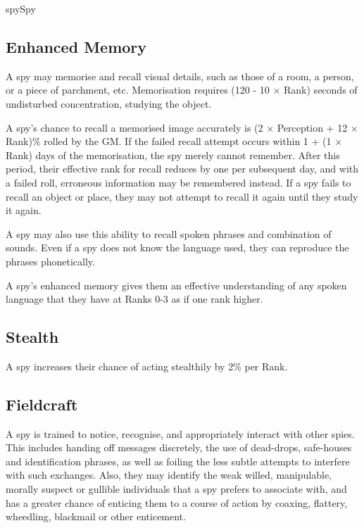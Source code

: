 \begin{Skill}[2.0]{spy}{Spy}
\subsection{Enhanced Memory}

\begin{Itemize}

\item A spy may memorise and recall visual details, such as those of a
  room, a person, or a piece of parchment, etc. Memorisation requires
  (120 - 10 × Rank) seconds of undisturbed concentration, studying
  the object.

\item A spy’s chance to recall a memorised image accurately is (2 ×
  Perception + 12 × Rank)\% rolled by the GM.  If the failed recall
  attempt occurs within 1 + (1 × Rank) days of the memorisation, the
  spy merely cannot remember. After this period, their effective rank
  for recall reduces by one per subsequent day, and with a failed
  roll, erroneous information may be remembered instead.  If a spy
  fails to recall an object or place, they may not attempt to recall
  it again until they study it again.

\item A spy may also use this ability to recall spoken phrases and
  combination of sounds.  Even if a spy does not know the language
  used, they can reproduce the phrases phonetically.

\item A spy’s enhanced memory gives them an effective understanding of
  any spoken language that they have at Ranks 0-3 as if one rank
  higher.

\end{Itemize}

\subsection{Stealth}

A spy increases their chance of acting stealthily by 2\% per Rank. 

\subsection{Fieldcraft}

A spy is trained to notice, recognise, and appropriately interact with
other spies. This includes handing off messages discretely, the use
of dead-drops, safe-houses and identification phrases, as well as
foiling the less subtle attempts to interfere with such exchanges.
Also, they may identify the weak willed, manipulable, morally suspect
or gullible individuals that a spy prefers to associate with, and has
a greater chance of enticing them to a course of action by coaxing,
flattery, wheedling, blackmail or other enticement.


\end{Skill}
